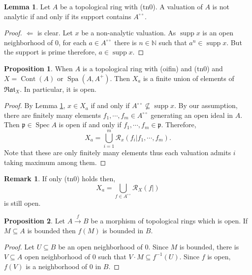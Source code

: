 \documentclass[10pt]{article}
\numberwithin{equation}{section}
\theoremstyle{definition}
\newtheorem{proposition}{Proposition}[subsection]
\newtheorem{lemma}{Lemma}[subsection]
\newtheorem{remark}{Remark}[subsection]
\DeclareMathOperator{\supp}{supp}
\DeclareMathOperator{\Spec}{Spec}
\DeclareMathOperator{\Spa}{Spa}
\DeclareMathOperator{\Cont}{Cont}
\newcommand{\N}[0]{\mathbb{N}}
\newcommand{\cR}[0]{\mathcal{R}}
\newcommand{\p}[0]{\mathfrak{p}}
\newcommand{\dcirc}[0]{{\circ\circ}}
\newcommand{\Rat}[0]{\mathfrak{Rat}}
\begin{document}
\begin{lemma}
    \label{lemma_15_15_1}
    Let $A$ be a topological ring with (tn0). A valuation of $A$ is not analytic if and only if its support contains $A^\dcirc$.
\end{lemma}
\begin{proof}
    $\Leftarrow$ is clear. Let $x$ be a non-analytic valuation. As $\supp x$ is an open neighborhood of $0$, for each $a\in A^\dcirc$ there is $n\in\N$ such that $a^n\in\supp x$. But the support is prime therefore, $a\in\supp x$.
\end{proof}

\begin{proposition}
    \label{fact_15_15}
    When $A$ is a topological ring with (oifin) and (tn0) and $X=\Cont(A)$ or $\Spa(A,A^+)$. Then $X_a$ is a finite union of elements of $\Rat_X$. In particular, it is open.
\end{proposition}
\begin{proof}
    By Lemma \ref{lemma_15_15_1}, $x\in X_a$ if and only if $A^\dcirc\not\subseteq \supp x$. By our assumption, there are finitely many elements $f_1,\cdots,f_m\in A^\dcirc$ generating an open ideal in $A$. Then $\p\in\Spec A$ is open if and only if $f_1,\cdots,f_m\in\p$. Therefore,
    \begin{equation*}
        X_a = \bigcup_{i=1}^m\cR_x(f_i|f_1,\cdots,f_m).
    \end{equation*}
    Note that these are only finitely many elements thus each valuation admits $i$ taking maximum among them.
\end{proof}

\begin{remark}
    If only (tn0) holds then,
    \begin{equation*}
        X_a = \bigcup_{f\in A^\dcirc}\cR_X(f|)
    \end{equation*}
    is still open.
\end{remark}

\begin{proposition}
    \label{fact_15_16}
    Let $A\stackrel{f}{\to} B$ be a morphism of topological rings which is open. If $M\subseteq A$ is bounded then $f(M)$ is bounded in $B$.
\end{proposition}

\begin{proof}
    Let $U\subseteq B$ be an open neighborhood of $0$. Since $M$ is bounded, there is $V\subseteq A$ open neighborhood of $0$ such that $V\cdot M\subseteq f^{-1}(U)$. Since $f$ is open, $f(V)$ is a neighborhood of $0$ in $B$.
\end{proof}
\end{document}
